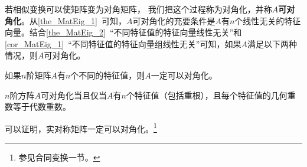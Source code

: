 若相似变换可以使矩阵变为对角矩阵， 我们把这个过程称为对角化，并称$A$\textbf{可对角化}。从\autoref{the_MatEig_1}~可知，$A$可对角化的充要条件是$A$有$n$个线性无关的特征向量。结合\autoref{the_MatEig_2}~“不同特征值的特征向量线性无关”和\autoref{cor_MatEig_1}~“不同特征值的特征向量组线性无关”可知，如果$A$满足以下两种情况，则$A$可对角化。
\begin{corollary}{}
如果$n$阶矩阵$A$有$n$个不同的特征值，则$A$一定可以对角化。
\end{corollary}
\begin{corollary}{}
$n$阶方阵$A$可对角化当且仅当$A$有$n$个特征值（包括重根），且每个特征值的几何重数等于代数重数。
\end{corollary}



可以证明，实对称矩阵一定可以对角化。\footnote{参见合同变换一节。}

